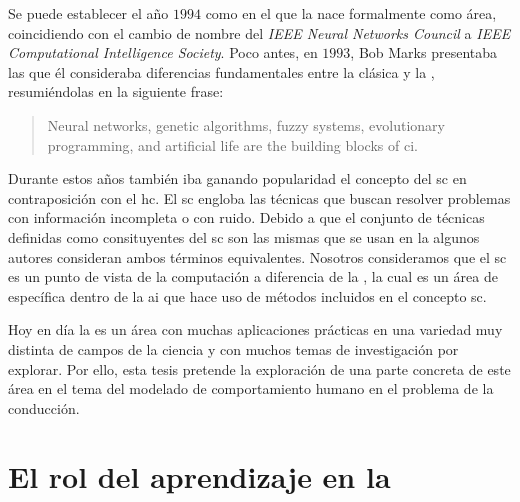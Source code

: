 Se puede establecer el año $1994$ como en el que la  nace formalmente como área, coincidiendo con el cambio de nombre del \textit{IEEE Neural Networks Council} a \textit{IEEE Computational Intelligence Society}. Poco antes, en $1993$, Bob Marks presentaba las que él consideraba diferencias fundamentales entre la  clásica y la , resumiéndolas en la siguiente frase:

\blockquote{Neural networks, genetic algorithms, fuzzy systems, evolutionary programming, and artificial life are the building blocks of \acrlong{ci}.}

Durante estos años también iba ganando popularidad el concepto del \gls{sc} en contraposición con el \gls{hc}. El \gls{sc} engloba las técnicas que buscan resolver problemas con información incompleta o con ruido. Debido a que el conjunto de técnicas definidas como consituyentes del \gls{sc} son las mismas que se usan en la  algunos autores consideran ambos términos equivalentes. Nosotros consideramos que el \gls{sc} es un punto de vista de la computación a diferencia de la , la cual es un área de específica dentro de la \gls{ai} que hace uso de métodos incluidos en el concepto \gls{sc}.

Hoy en día la  es un área con muchas aplicaciones prácticas en una variedad muy distinta de campos de la ciencia y con muchos temas de investigación por explorar. Por ello, esta tesis pretende la exploración de una parte concreta de este área en el tema del modelado de comportamiento humano en el problema de la conducción.

\section{El rol del aprendizaje en la }
\label{s:the-learning-role}

